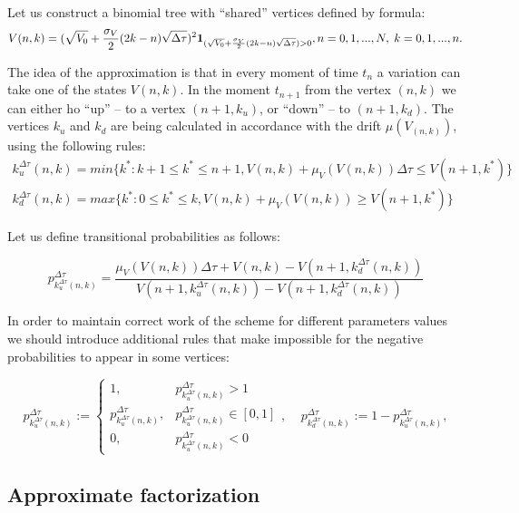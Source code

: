 \documentclass[a4paper]{jpconf}
\begin{document}
Let us construct a binomial tree with ``shared'' vertices defined by formula:
\begin{equation*}	
V(n,k) = (\sqrt{V_0} + \frac{\sigma_V}{2}(2k-n)\sqrt{\Delta \tau})^2 {\bf 1}_{(\sqrt{V_0} + \frac{\sigma_V}{2}(2k-n)\sqrt{\Delta \tau}) > 0}, 
\\ n = 0,1,...,N, \; k = 0,1,...,n.
\end{equation*}

The idea of the approximation is that in every moment of time $t_n$ a variation can take one of the states $V(n,k)$. In the moment $t_{n+1}$ from the vertex $(n,k)$ we can either ho ``up'' -- to a vertex $(n+1,k_u)$, or ``down'' -- to $(n+1,k_d)$. The vertices $k_u$ and $k_d$ are being calculated in accordance with the drift $\mu(V_{(n,k)})$, using the following rules:
\begin{eqnarray*}
	k_u^{\Delta \tau}(n,k) = min\{{k^\ast} : k + 1 \le k^\ast \le n + 1, V(n,k) + \mu_{V}(V(n,k)){\Delta \tau} \le V(n+1,k^\ast)\} \\
	k_d^{\Delta \tau}(n,k) = max\{{k^\ast} : 0 \le k^\ast \le k, V(n,k) + \mu_{V}(V(n,k)) \ge V(n+1,k^\ast)\}
\end{eqnarray*}

Let us define transitional probabilities as follows:

$$
p^{\Delta \tau}_{k^{\Delta \tau}_{u}(n,k)} = 
\frac{\mu_{V}(V(n,k))\Delta \tau+V(n,k)-V(n+1,k^{\Delta \tau}_{d}(n,k))}{V(n+1,k^{\Delta \tau}_{u}(n,k))-V(n+1,k^{\Delta \tau}_{d}(n,k))}
$$

In order to maintain correct work of the scheme for different parameters values we should introduce additional rules that make impossible for the negative probabilities to appear in some vertices:

\begin{equation*}
p^{\Delta \tau}_{k^{\Delta \tau}_{u}(n,k)} :=
\begin{cases}
1, & p^{\Delta \tau}_{k^{\Delta \tau}_{u}(n,k)} > 1\\
p^{\Delta \tau}_{k^{\Delta \tau}_{u}(n,k)}, & p^{\Delta \tau}_{k^{\Delta \tau}_{u}(n,k)} \in [0, 1]\\
0, & p^{\Delta \tau}_{k^{\Delta \tau}_{u}(n,k)} < 0
\end{cases}
, \;\;\;\; p^{\Delta \tau}_{k^{\Delta \tau}_{d}(n,k)} := 1 - p^{\Delta \tau}_{k^{\Delta \tau}_{u}(n,k)},
\end{equation*}

\subsection{Approximate factorization}
\end{document}
